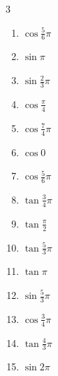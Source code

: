 \begin{multicols}{3}
\begin{enumerate}
  \item $\displaystyle \cos{\frac{5}{6}\pi}$

\columnbreak %

  \item $\displaystyle \sin{\pi}$
        \phantom{$\displaystyle =0$}

  \item $\displaystyle \sin{\frac{2}{3}\pi}$

  \item $\displaystyle \cos{\frac{\pi}{4}}$

  \item $\displaystyle \cos{\frac{7}{4}\pi}$

  \item $\displaystyle \cos{0}$
        \phantom{$\displaystyle =1$}

  \item $\displaystyle \cos{\frac{5}{6}\pi}$

  \item $\displaystyle \tan{\frac{3}{4}\pi}$
        \phantom{$\displaystyle =-1$}

  \item $\displaystyle \tan{\frac{\pi}{2}}$
        \phantom{$\displaystyle \quad なし$}

  \item $\displaystyle \tan{\frac{5}{3}\pi}$

  \item $\displaystyle \tan{\pi}$
        \phantom{$\displaystyle =0$}

  \item $\displaystyle \sin{\frac{5}{3}\pi}$

  \item $\displaystyle \cos{\frac{3}{4}\pi}$

  \item $\displaystyle \tan{\frac{4}{3}\pi}$

  \item $\displaystyle \sin{2\pi}$
        \phantom{$\displaystyle =0$}


\end{enumerate}
\end{multicols}
